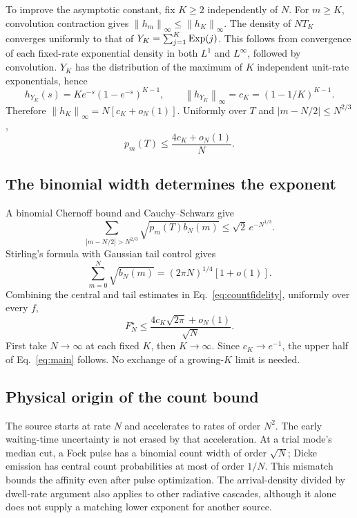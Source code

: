 \documentclass[11pt,a4paper]{article}
\newcommand{\norm}[1]{\left\lVert#1\right\rVert}
\begin{document}
To improve the asymptotic constant, fix $K\ge2$ independently of $N$. For $m\ge K$, convolution contraction gives $\norm{h_m}_\infty\le\norm{h_K}_\infty$. The density of $NT_K$ converges uniformly to that of $Y_K=\sum_{j=1}^K{\rm Exp}(j)$. This follows from convergence of each fixed-rate exponential density in both $L^1$ and $L^\infty$, followed by convolution. $Y_K$ has the distribution of the maximum of $K$ independent unit-rate exponentials, hence
\begin{equation}
 h_{Y_K}(s)=Ke^{-s}(1-e^{-s})^{K-1},\qquad
 \norm{h_{Y_K}}_\infty=c_K=(1-1/K)^{K-1}.
\end{equation}
Therefore $\norm{h_K}_\infty=N[c_K+o_N(1)]$. Uniformly over $T$ and $|m-N/2|\le N^{2/3}$,
\begin{equation}
 p_m(T)\le\frac{4c_K+o_N(1)}{N}.
\end{equation}

\subsection{The binomial width determines the exponent}
A binomial Chernoff bound and Cauchy--Schwarz give
\begin{equation}
 \sum_{|m-N/2|>N^{2/3}}\sqrt{p_m(T)b_N(m)}
 \le\sqrt2\,e^{-N^{1/3}}.
\end{equation}
Stirling's formula with Gaussian tail control gives
\begin{equation}
 \sum_{m=0}^N\sqrt{b_N(m)}=(2\pi N)^{1/4}[1+o(1)].
\end{equation}
Combining the central and tail estimates in Eq.~\eqref{eq:countfidelity}, uniformly over every $f$,
\begin{equation}
 F_N^\star\le\frac{4c_K\sqrt{2\pi}+o_N(1)}{\sqrt N}.
\end{equation}
First take $N\to\infty$ at each fixed $K$, then $K\to\infty$. Since $c_K\to e^{-1}$, the upper half of Eq.~\eqref{eq:main} follows. No exchange of a growing-$K$ limit is needed.


\subsection{Physical origin of the count bound}
The source starts at rate \(N\) and accelerates to rates of order
\(N^2\). The early waiting-time uncertainty is not erased by that
acceleration. At a trial mode's median cut, a Fock pulse has a
binomial count width of order \(\sqrt N\); Dicke emission has central
count probabilities at most of order \(1/N\). This mismatch bounds the
affinity even after pulse optimization. The arrival-density divided
by dwell-rate argument also applies to other radiative cascades,
although it alone does not supply a matching lower exponent for
another source.
\end{document}
